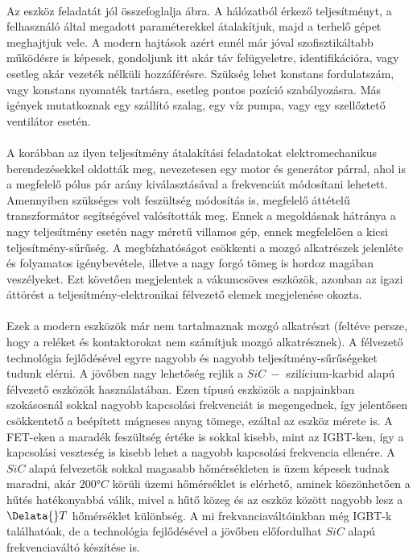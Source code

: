 \paragraph{}
Az eszköz feladatát jól összefoglalja  ábra. A hálózatból érkező teljesítményt, a felhasználó által megadott paraméterekkel átalakítjuk, majd a terhelő gépet meghajtjuk vele. A modern hajtások azért ennél már jóval szofisztikáltabb működésre is képesek, gondoljunk itt akár táv felügyeletre, identifikációra, vagy esetleg akár vezeték nélküli hozzáférésre. Szükség lehet konstans fordulatszám, vagy konstans nyomaték tartásra, esetleg pontos pozíció szabályozásra. Más igények mutatkoznak egy szállító szalag, egy víz pumpa, vagy egy szellőztető ventilátor esetén.

\paragraph{}
A korábban az ilyen teljesítmény átalakítási feladatokat elektromechanikus berendezésekkel oldották meg, nevezetesen egy motor és generátor párral, ahol is a megfelelő pólus pár arány kiválasztásával a frekvenciát módosítani lehetett. Amennyiben szükséges volt feszültség módosítás is, megfelelő áttételű transzformátor segítségével valósították meg. Ennek a megoldásnak hátránya a nagy teljesítmény esetén nagy méretű villamos gép, ennek megfelelően a kicsi teljesítmény-sűrűség. A megbízhatóságot csökkenti a mozgó alkatrészek jelenléte és folyamatos igénybevétele, illetve a nagy forgó tömeg is hordoz magában veszélyeket. Ezt követően megjelentek a vákumcsöves eszközök, azonban az igazi áttörést a teljesítmény-elektronikai félvezető elemek megjelenése okozta.

\paragraph{}
Ezek a modern eszközök már nem tartalmaznak mozgó alkatrészt (feltéve persze, hogy a reléket és kontaktorokat nem számítjuk mozgó alkatrésznek). A félvezető technológia fejlődésével egyre nagyobb és nagyobb teljesítmény-sűrűségeket tudunk elérni. A jövőben nagy lehetőség rejlik a $SiC \ - $  szilícium-karbid alapú félvezető eszközök használatában. Ezen típusú eszközök a napjainkban szokásosnál sokkal nagyobb kapcsolási frekvenciát is megengednek, így jelentősen csökkentető a beépített mágneses anyag tömege, ezáltal az eszköz mérete is. A FET-eken a maradék feszültség értéke is sokkal kisebb, mint az IGBT-ken, így a kapcsolási veszteség is kisebb lehet a nagyobb kapcsolási frekvencia ellenére. A $SiC$ alapú felvezetők sokkal magasabb hőmérsékleten is üzem képesek tudnak maradni, akár $200 °C$ körüli üzemi hőmérséklet is elérhető, aminek köszönhetően a hűtés hatékonyabbá válik, mivel a hűtő közeg és az eszköz között nagyobb lesz a $\Delata{}T$ hőmérséklet különbség. A mi frekvanciaváltóinkban még IGBT-k találhatóak, de a technológia fejlődésével a jövőben előfordulhat $SiC$ alapú frekvenciaváltó készítése is.

